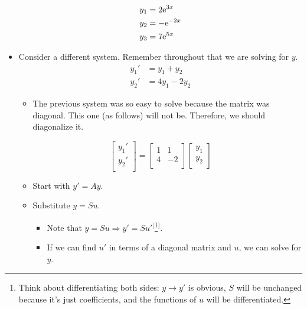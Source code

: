 \documentclass{article}
\begin{document}
\begin{itemize}
\begin{itemize}
    \end{itemize}
    \begin{align*}
        y_1 &= 2\text{e}^{3x}\\
        y_2 &= -\text{e}^{-2x}\\
        y_3 &= 7\text{e}^{5x}
    \end{align*}
    \item Consider a different system. Remember throughout that we are solving for $y$.
    \begin{align*}
        y_1' &= y_1+y_2\\
        y_2' &= 4y_1-2y_2
    \end{align*}
    \begin{itemize}
        \item The previous system was so easy to solve because the matrix was diagonal. This one (as follows) will not be. Therefore, we should diagonalize it.
    \end{itemize}
    \begin{equation*}
        \begin{bmatrix}
            y_1'\\
            y_2'\\
        \end{bmatrix}
        =
        \begin{bmatrix}
            1 & 1\\
            4 & -2\\
        \end{bmatrix}
        \begin{bmatrix}
            y_1\\
            y_2\\
        \end{bmatrix}
    \end{equation*}
    \begin{itemize}
        \item Start with $y'=Ay$.
        \item Substitute $y=Su$.
        \begin{itemize}
            \item Note that $y=Su\Rightarrow y'=Su'$$^[$\footnote{Think about differentiating both sides: $y\rightarrow y'$ is obvious, $S$ will be unchanged because it's just coefficients, and the functions of $u$ will be differentiated.}$^]$.
            \item If we can find $u'$ in terms of a diagonal matrix and $u$, we can solve for $y$.
        \end{itemize}

\end{itemize}
\end{itemize}
\end{document}
